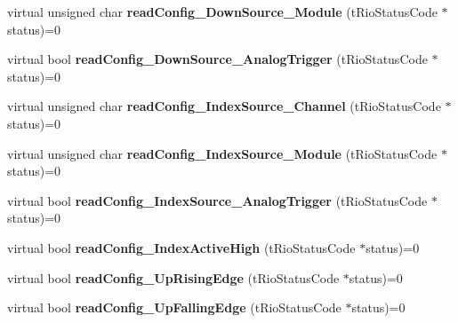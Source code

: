 \begin{DoxyCompactItemize}
\item 
\hypertarget{classnFPGA_1_1nFRC__2012__1__6__4_1_1tCounter_a6b01b5fb0297417d8f576f1f939dcee2}{
virtual unsigned char {\bfseries readConfig\_\-DownSource\_\-Module} (tRioStatusCode $\ast$status)=0}
\label{classnFPGA_1_1nFRC__2012__1__6__4_1_1tCounter_a6b01b5fb0297417d8f576f1f939dcee2}

\item 
\hypertarget{classnFPGA_1_1nFRC__2012__1__6__4_1_1tCounter_af5b4daab77c592ecaa6887b6a5efa8d2}{
virtual bool {\bfseries readConfig\_\-DownSource\_\-AnalogTrigger} (tRioStatusCode $\ast$status)=0}
\label{classnFPGA_1_1nFRC__2012__1__6__4_1_1tCounter_af5b4daab77c592ecaa6887b6a5efa8d2}

\item 
\hypertarget{classnFPGA_1_1nFRC__2012__1__6__4_1_1tCounter_a290fb9b1aaec9fd3b4bdfac887bf0c2d}{
virtual unsigned char {\bfseries readConfig\_\-IndexSource\_\-Channel} (tRioStatusCode $\ast$status)=0}
\label{classnFPGA_1_1nFRC__2012__1__6__4_1_1tCounter_a290fb9b1aaec9fd3b4bdfac887bf0c2d}

\item 
\hypertarget{classnFPGA_1_1nFRC__2012__1__6__4_1_1tCounter_abf83dc3831944299debcbc85a22c62ef}{
virtual unsigned char {\bfseries readConfig\_\-IndexSource\_\-Module} (tRioStatusCode $\ast$status)=0}
\label{classnFPGA_1_1nFRC__2012__1__6__4_1_1tCounter_abf83dc3831944299debcbc85a22c62ef}

\item 
\hypertarget{classnFPGA_1_1nFRC__2012__1__6__4_1_1tCounter_a2ab94be1fc90c71c52d8109a43b00e9d}{
virtual bool {\bfseries readConfig\_\-IndexSource\_\-AnalogTrigger} (tRioStatusCode $\ast$status)=0}
\label{classnFPGA_1_1nFRC__2012__1__6__4_1_1tCounter_a2ab94be1fc90c71c52d8109a43b00e9d}

\item 
\hypertarget{classnFPGA_1_1nFRC__2012__1__6__4_1_1tCounter_a1501e1cf46eabc35f2df33555f8c6f8b}{
virtual bool {\bfseries readConfig\_\-IndexActiveHigh} (tRioStatusCode $\ast$status)=0}
\label{classnFPGA_1_1nFRC__2012__1__6__4_1_1tCounter_a1501e1cf46eabc35f2df33555f8c6f8b}

\item 
\hypertarget{classnFPGA_1_1nFRC__2012__1__6__4_1_1tCounter_adc95697fe6d0427e3b05f20160fb18a5}{
virtual bool {\bfseries readConfig\_\-UpRisingEdge} (tRioStatusCode $\ast$status)=0}
\label{classnFPGA_1_1nFRC__2012__1__6__4_1_1tCounter_adc95697fe6d0427e3b05f20160fb18a5}

\item 
\hypertarget{classnFPGA_1_1nFRC__2012__1__6__4_1_1tCounter_ab91ce08da36fcc0a3c212f0b369c46a4}{
virtual bool {\bfseries readConfig\_\-UpFallingEdge} (tRioStatusCode $\ast$status)=0}
\label{classnFPGA_1_1nFRC__2012__1__6__4_1_1tCounter_ab91ce08da36fcc0a3c212f0b369c46a4}


\end{DoxyCompactItemize}

